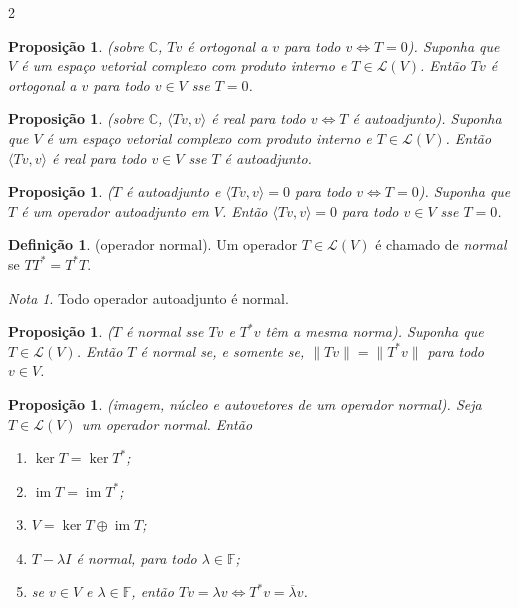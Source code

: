 \documentclass{article}
\theoremstyle{plain}
\newtheorem{prop}[thm]{Proposição}
\theoremstyle{definition}
\newtheorem{defn}{Definição}[section]
\theoremstyle{remark}
\newtheorem*{rem}{Nota}
\DeclareMathOperator{\im}{im}
\begin{document}
\begin{multicols}{2}
\begin{prop} (sobre \(\mathbb{C}\), \(Tv\) é ortogonal a \(v\) para todo \(v \iff T = 0\)).
    Suponha que \(V\) é um espaço vetorial complexo com produto interno e \(T \in \mathcal{L}(V)\). Então \(Tv\) é ortogonal a \(v\) para todo \(v \in V\) sse \(T = 0\).
\end{prop}

\begin{prop} (sobre \(\mathbb{C}\), \(\langle Tv, v \rangle\) é real para todo \(v \iff T\) é autoadjunto).
    Suponha que \(V\) é um espaço vetorial complexo com produto interno e \(T \in \mathcal{L}(V)\). Então \(\langle Tv, v \rangle\) é real para todo \(v \in V\) sse \(T\) é autoadjunto.
\end{prop}

\begin{prop} (\(T\) é autoadjunto e \(\langle Tv, v \rangle = 0\) para todo \(v \iff T = 0\)).
    Suponha que \(T\) é um operador autoadjunto em \(V\). Então \(\langle Tv, v \rangle = 0\) para todo \(v \in V\) sse \(T = 0\).
\end{prop}

\begin{defn} (operador normal).
    Um operador \(T \in \mathcal{L}(V)\) é chamado de \emph{normal} se \(T T^* = T^* T\).
\end{defn}

\begin{rem}
    Todo operador autoadjunto é normal.
\end{rem}

\begin{prop} (\(T\) é normal sse \(Tv\) e \(T^* v\) têm a mesma norma).
    Suponha que \(T \in \mathcal{L}(V)\). Então \(T\) é normal se, e somente se, \(\|Tv\| = \|T^* v\|\) para todo \(v \in V\).
\end{prop}

\begin{prop} (imagem, núcleo e autovetores de um operador normal).
    Seja \(T \in \mathcal{L}(V)\) um operador normal. Então
    \begin{enumerate}
        \item [\textup{(a)}] \(\ker T = \ker T^*\);
        \item [\textup{(b)}] \(\im T = \im T^*\);
        \item [\textup{(c)}] \(V = \ker T \oplus \im T\);
        \item [\textup{(d)}] \(T - \lambda I\) é normal, para todo \(\lambda \in \mathbb{F}\);
        \item [\textup{(e)}] se \(v \in V\) e \(\lambda \in \mathbb{F}\), então \(Tv = \lambda v \iff T^* v = \overline{\lambda} v\).
    \end{enumerate}
\end{prop}


\end{multicols}
\end{document}
